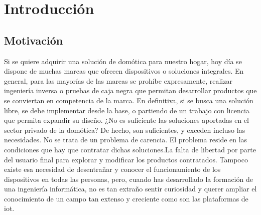 \cleardoublepage

\chapter{Introducción}

\section{Motivación}
\label{ch:Capitulo1}

Si se quiere adquirir una solución de domótica para nuestro hogar, hoy día se dispone de muchas marcas que ofrecen dispositivos o soluciones integrales. En general, para las mayorías de las marcas se prohíbe expresamente, realizar ingeniería inversa o pruebas de caja negra que permitan desarrollar productos que se conviertan en competencia de la marca. En definitiva, si se busca una solución libre, se debe  implementar desde la base, o partiendo de un trabajo con licencia que permita expandir su diseño. ¿No es suficiente las soluciones aportadas en el sector privado de la domótica? De hecho, son suficientes, y exceden incluso las necesidades. No se trata de un problema de carencia. El problema reside en las condiciones que hay que contratar dichas soluciones.La falta de libertad por parte del usuario final para explorar y modificar los productos contratados. Tampoco existe esa necesidad de desentrañar y conocer el funcionamiento de los dispositivos en todas las personas, pero, cuando has desarrollado la formación de una ingeniería informática, no es tan extraño sentir curiosidad y querer ampliar el conocimiento de un campo tan extenso y creciente como son las plataformas de \gls{iot}.

\vspace{1cm}

